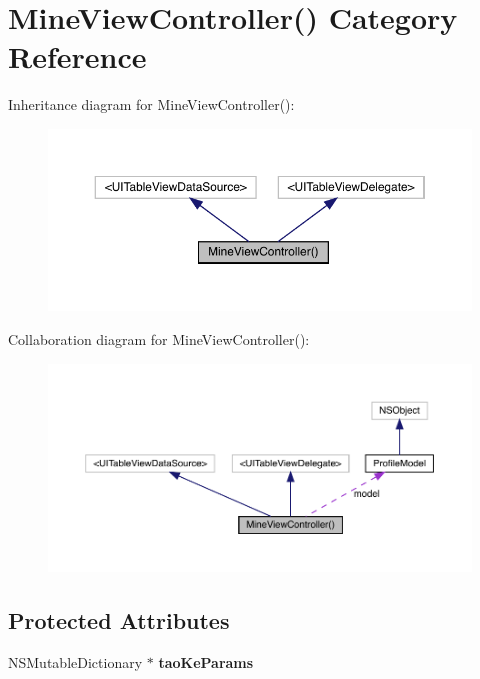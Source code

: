 \hypertarget{category_mine_view_controller_07_08}{}\section{Mine\+View\+Controller() Category Reference}
\label{category_mine_view_controller_07_08}


Inheritance diagram for Mine\+View\+Controller()\+:\nopagebreak
\begin{figure}[H]
\begin{center}
\leavevmode
\includegraphics[width=350pt]{category_mine_view_controller_07_08__inherit__graph}
\end{center}
\end{figure}


Collaboration diagram for Mine\+View\+Controller()\+:\nopagebreak
\begin{figure}[H]
\begin{center}
\leavevmode
\includegraphics[width=350pt]{category_mine_view_controller_07_08__coll__graph}
\end{center}
\end{figure}
\subsection*{Protected Attributes}
\begin{DoxyCompactItemize}
\item 
\mbox{\label{category_mine_view_controller_07_08_a3cec5dc3dbb11c65afa861ae3f0cef9c}} 
N\+S\+Mutable\+Dictionary $\ast$ {\bfseries tao\+Ke\+Params}
\end{DoxyCompactItemize}
